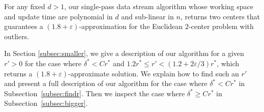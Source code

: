 \documentclass[envcountsame]{cls/cccg15}
\newcommand{\lee}{\leqslant}
\newcommand{\gee}{\geqslant}
\renewcommand{\le}{\lee}
\renewcommand{\ge}{\gee}
\newcommand{\eps}{\varepsilon}
\begin{document}
\begin{theorem}
For any fixed $d > 1$, our single-pass data stream algorithm whose working space and update time are polynomial in $d$ and sub-linear in $n$, returns two centers that guarantees a $(1.8 + \eps)$-approximation for the Euclidean $2$-center problem with outliers.
\end{theorem}



In Section \ref{subsec:smaller}, we give a description of our algorithm for a given $r' > 0$ for the case where $\delta^* < C r^*$ and $1.2r^* \le r' < (1.2 + 2\eps/3)r^*$, which returns a $(1.8 + \eps)$-approximate solution. We explain how to find such an $r'$ and present a full description of our algorithm for the case where $\delta^* < C r^*$ in Subsection~\ref{subsec:findr}. Then we inspect the case where $\delta^* \ge C r^*$ in Subsection~\ref{subsec:bigger}.
\end{document}
